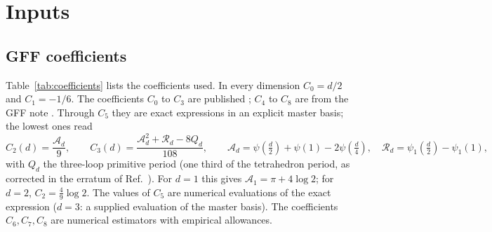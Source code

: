 \documentclass[11pt,a4paper]{article}
\numberwithin{equation}{section}
\begin{document}
\section{Inputs}\label{sec:inputs}
\subsection{GFF coefficients}
Table~\ref{tab:coefficients} lists the coefficients used. In every dimension
$C_0=d/2$ and $C_1=-1/6$. The coefficients $C_0$ to $C_3$ are published
\cite{Benedetti:2020rrq}; $C_4$ to $C_8$ are from the GFF note \cite{noteGFF}. Through $C_5$
they are exact expressions in an explicit master basis; the lowest ones read
\begin{equation}
 C_2(d)=\frac{\mathcal A_d}{9},\qquad
 C_3(d)=\frac{\mathcal A_d^2+\mathcal R_d-8Q_d}{108},\qquad
 \mathcal A_d=\psi(\tfrac d2)+\psi(1)-2\psi(\tfrac d4),\quad
 \mathcal R_d=\psi_1(\tfrac d2)-\psi_1(1),
 \label{eq:C2C3}
\end{equation}
with $Q_d$ the three-loop primitive period (one third of the tetrahedron period, as
corrected in the erratum of Ref.~\cite{Benedetti:2020rrq}). For $d=1$ this gives
$\mathcal A_1=\pi+4\log2$; for $d=2$, $C_2=\frac49\log2$. The values of $C_5$ are
numerical evaluations of the exact expression ($d=3$: a supplied evaluation of the
master basis). The coefficients $C_6,C_7,C_8$ are numerical estimators with empirical
allowances.
\end{document}
